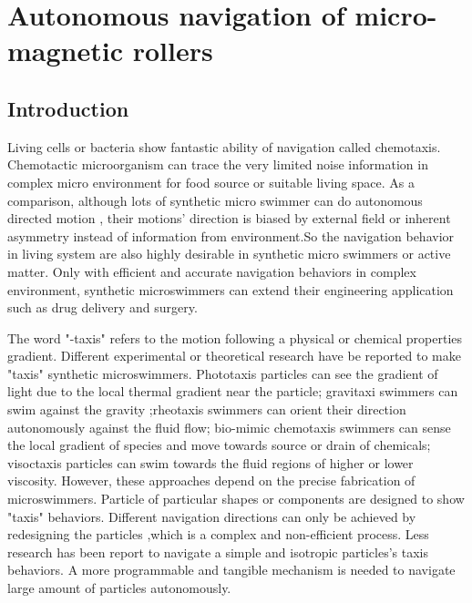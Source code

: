 \chapter{Autonomous navigation of micro-magnetic rollers} 
\section{Introduction}
Living cells or bacteria show fantastic ability of navigation called chemotaxis.\cite{alon1999robustness,adler1975chemotaxis} Chemotactic microorganism can trace the very limited noise information in complex micro environment for food source or suitable living space.\cite{keller1971model} As a comparison, although lots of synthetic  micro swimmer can do autonomous directed motion \cite{yan2016reconfiguring,dou2016directed,lee2019directed,baker2019shape}, their motions' direction is biased by  external field or inherent asymmetry instead of information from environment.So the navigation behavior in living system are also highly desirable in synthetic micro swimmers or active matter. \cite{patteson2016active} Only with efficient and accurate navigation behaviors in complex environment, synthetic microswimmers can extend their engineering application  such as drug delivery and surgery.\cite{de2017micromotor,xu2018sperm}

The word "-taxis" refers to the motion following a physical or chemical properties gradient. Different experimental or theoretical research have be reported to make "taxis" synthetic microswimmers. Phototaxis particles can see the gradient of light due to the local thermal gradient near the particle\cite{yu2019phototaxis,dai2016programmable,lozano2016phototaxis,chen2017light}; gravitaxi swimmers can swim against the gravity \cite{campbell2013gravitaxis,ten2014gravitaxis};rheotaxis swimmers can orient their direction autonomously against the fluid flow\cite{Palacci2015,ren2017rheotaxis,brosseau2019relating}; bio-mimic chemotaxis swimmers can sense the local gradient of species and move towards source or drain of chemicals; visoctaxis particles can swim towards the fluid regions of higher or lower viscosity\cite{liebchen2018viscotaxis}. However, these approaches depend on the precise fabrication of microswimmers. Particle of particular shapes or components are designed to show "taxis" behaviors. Different navigation directions can only be achieved by redesigning the particles ,which is a complex and non-efficient process. Less research has been report to navigate a simple and isotropic particles's taxis behaviors. A more programmable and tangible mechanism is needed to navigate large amount of particles autonomously. \cite{dou2019autonomous}

